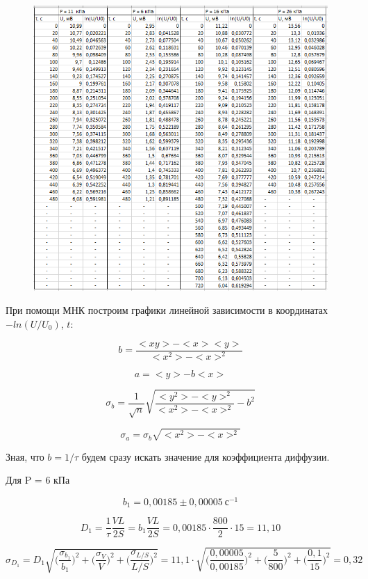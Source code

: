 \documentclass[11pt]{article}
\begin{document}
\begin{figure}[h!]
\centering
\includegraphics[scale=1.4]{table.png}
\label{fig:Image1}
\end{figure}

При помощи МНК построим графики линейной зависимости в координатах $-ln (U/U_0)$, $t$:

\[ b = \frac{<xy> - <x><y>}{<x^2> - <x>^2}\]

\[a =<y> - b<x>\]

\[\sigma_b = \frac{1}{\sqrt{n}} \sqrt { \frac{<y^2> - <y>^2}{<x^2> - <x>^2}  - b^2}\]

\[\sigma_a = \sigma_b \sqrt{<x^2> - <x>^2}\]

\vspace{0.5cm}

Зная, что $b = 1/\tau$ будем сразу искать значение для коэффициента диффузии.

Для P = 6 кПа

\[b_1 = 0,00185 \pm 0,00005 \: \textit{с}^{-1}\]

\[D_1 = \frac{1}{\tau} \frac{VL}{2S} = b_1 \frac{VL}{2S} = 0,00185 \cdot \frac{800}{2} \cdot 15 = 11,10\]

\[\sigma_{D_1} = D_1 \sqrt{\Big( \frac{\sigma_{b_1}}{b_1} \Big)^2 + \Big( \frac{\sigma_V}{V} \Big)^2 + \Big( \frac{\sigma_{L/S}}{L/S} \Big)^2} = 11,1 \cdot \sqrt{\Big( \frac{0,00005}{0,00185} \Big)^2 + \Big( \frac{5}{800} \Big)^2 + \Big( \frac{0,1}{15} \Big)^2} = 0,32\]
\end{document}
